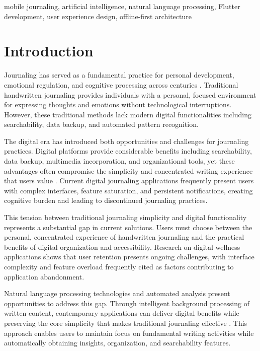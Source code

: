 \documentclass[conference]{IEEEtran}
\begin{document}
\begin{IEEEkeywords}
mobile journaling, artificial intelligence, natural language processing, Flutter development, user experience design, offline-first architecture
\end{IEEEkeywords}

\thispagestyle{firstpagefooter}

\section{Introduction}

Journaling has served as a fundamental practice for personal development, emotional regulation, and cognitive processing across centuries \cite{pennebaker1999forming}. Traditional handwritten journaling provides individuals with a personal, focused environment for expressing thoughts and emotions without technological interruptions. However, these traditional methods lack modern digital functionalities including searchability, data backup, and automated pattern recognition.

The digital era has introduced both opportunities and challenges for journaling practices. Digital platforms provide considerable benefits including searchability, data backup, multimedia incorporation, and organizational tools, yet these advantages often compromise the simplicity and concentrated writing experience that users value \cite{sloan2015efficacy}. Current digital journaling applications frequently present users with complex interfaces, feature saturation, and persistent notifications, creating cognitive burden and leading to discontinued journaling practices.

This tension between traditional journaling simplicity and digital functionality represents a substantial gap in current solutions. Users must choose between the personal, concentrated experience of handwritten journaling and the practical benefits of digital organization and accessibility. Research on digital wellness applications shows that user retention presents ongoing challenges, with interface complexity and feature overload frequently cited as factors contributing to application abandonment.

Natural language processing technologies and automated analysis present opportunities to address this gap. Through intelligent background processing of written content, contemporary applications can deliver digital benefits while preserving the core simplicity that makes traditional journaling effective \cite{allahyari2017text}. This approach enables users to maintain focus on fundamental writing activities while automatically obtaining insights, organization, and searchability features.
\end{document}
